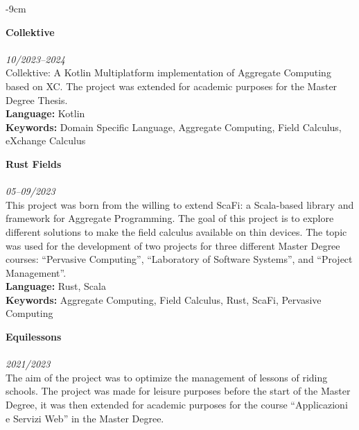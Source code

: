 \documentclass[10pt,a4paper]{altacv}
\begin{document}
\begin{adjustwidth}{}{-9cm}

    \textbf{Collektive}\\
    \\
    \textit{10/2023--2024}\\ \smallskip
    Collektive: A Kotlin Multiplatform implementation of Aggregate Computing based on XC. The project was extended for academic purposes for the Master Degree Thesis.\\ \smallskip
    \smallskip
    \textbf{Language:} Kotlin\\
    \textbf{Keywords:} Domain Specific Language, Aggregate Computing, Field Calculus, eXchange Calculus

    \divider

    \textbf{Rust Fields}\\
    \\
    \textit{05--09/2023}\\ \smallskip
    This project was born from the willing to extend ScaFi: a Scala-based library and framework for Aggregate Programming.
    The goal of this project is to explore different solutions to make the field calculus available on thin devices.
    The topic was used for the development of two projects for three different Master Degree courses: ``Pervasive Computing'',
    ``Laboratory of Software Systems'', and ``Project Management''.\\ \smallskip
    \textbf{Language:} Rust, Scala\\
    \textbf{Keywords:} Aggregate Computing, Field Calculus, Rust, ScaFi, Pervasive Computing

    \divider

    \textbf{Equilessons}\\
    \\
    \textit{2021/2023}\\ \smallskip
    The aim of the project was to optimize the management of lessons of riding schools.
    The project was made for leisure purposes before the start of the Master Degree, it was then extended for academic purposes for the course ``Applicazioni e Servizi Web'' in the Master Degree.\\ \smallskip
    \smallskip


\end{adjustwidth}
\end{document}
